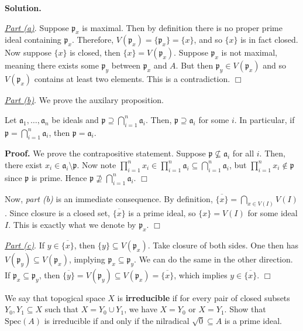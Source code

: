 \documentclass{template}
\newcommand{\qedwhite}{\hfill \ensuremath{\Box}}
\begin{document}
\textbf{Solution.} 

\underline{\textit{Part (a)}}. Suppose $\mathfrak{p}_x$ is maximal. Then by definition there
is no proper prime ideal containing $\mathfrak{p}_x$. Therefore,
$V(\mathfrak{p}_x) = \{\mathfrak{p}_x\} = \{x\}$, and so $\{x\}$ is in fact
closed. Now suppose $\{x\}$ is closed, then $\{x\} = V(\mathfrak{p}_x)$. Suppose
$\mathfrak{p}_x$ is not maximal, meaning there exists some $\mathfrak{p}_y$
between $\mathfrak{p}_x$ and $A$. But then $\mathfrak{p}_y \in
V(\mathfrak{p}_x)$ and so $V(\mathfrak{p}_x)$ contains at least two elements.
This is a contradiction. \qedwhite

\underline{\textit{Part (b)}}. We prove the auxilary proposition.

\begin{propositions}
    Let $\mathfrak{a}_1,\dots,\mathfrak{a}_n$ be ideals and $\mathfrak{p}
    \supseteq \bigcap_{i=1}^n \mathfrak{a}_i$. Then, $\mathfrak{p} \supseteq
    \mathfrak{a}_i$ for some $i$. In particular, if $\mathfrak{p} =
    \bigcap_{i=1}^n \mathfrak{a}_i$, then $\mathfrak{p}=\mathfrak{a}_i$.
\end{propositions}

\textbf{Proof.} We prove the contrapositive statement. Suppose $\mathfrak{p}
\not\subseteq \mathfrak{a}_i$ for all $i$. Then, there exist $x_i
\in \mathfrak{a}_i \setminus \mathfrak{p}$. Now note $\prod_{i=1}^n x_i \in
\prod_{i=1}^n \mathfrak{a}_i \subseteq \bigcap_{i=1}^n \mathfrak{a}_i$, but
$\prod_{i=1}^n x_i \not\in \mathfrak{p}$ since $\mathfrak{p}$ is prime. Hence
$\mathfrak{p} \not\supseteq \bigcap_{i=1}^n \mathfrak{a}_i$. \qedwhite

Now, \textit{part (b)} is an immediate consequence. By definition,
$\overline{\{x\}} = \bigcap_{x \in V(I)}V(I)$. Since closure is a closed set,
$\overline{\{x\}}$ is a prime ideal, so $\{x\} = V(I)$ for some ideal $I$. This
is exactly what we denote by $\mathfrak{p}_x$. \qedwhite

\underline{\textit{Part (c)}}. If $y \in \overline{\{x\}}$, then $\{y\} \subseteq
V(\mathfrak{p}_x)$. Take closure of both sides. One then has $V(\mathfrak{p}_y)
\subseteq V(\mathfrak{p}_x)$, implying $\mathfrak{p}_x \subseteq
\mathfrak{p}_y$. We can do the same in the other direction. If $\mathfrak{p}_x
\subseteq \mathfrak{p}_y$, then $\overline{\{y\}} = V(\mathfrak{p}_y) \subseteq
V(\mathfrak{p}_x) = \overline{\{x\}}$, which implies $y \in \overline{\{x\}}$.
\qedwhite

\begin{problem}[Exercise 3]
    We say that topogical space $X$ is \textbf{irreducible} if for every pair of
    closed subsets $Y_0,Y_1 \subseteq X$ such that $X = Y_0 \cup Y_1$, we have
    $X=Y_0$ or $X=Y_1$. Show that $\text{Spec}(A)$ is irreducible if and only 
    if the nilradical $\sqrt{0} \subseteq A$ is a prime ideal.
\end{problem}
\end{document}
